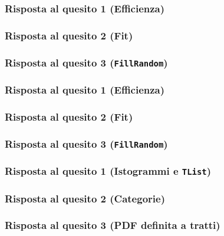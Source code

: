 \documentclass{article}
\begin{document}
\subsubsection{Risposta al quesito 1 (Efficienza)}

\subsubsection{Risposta al quesito 2 (Fit)}

\subsubsection{Risposta al quesito 3 (\texttt{FillRandom})}


\subsubsection{Risposta al quesito 1 (Efficienza)}

\subsubsection{Risposta al quesito 2 (Fit)}

\subsubsection{Risposta al quesito 3 (\texttt{FillRandom})}


\subsubsection{Risposta al quesito 1 (Istogrammi e \texttt{TList})}

\subsubsection{Risposta al quesito 2 (Categorie)}

\subsubsection{Risposta al quesito 3 (PDF definita a tratti)}

\end{document}

